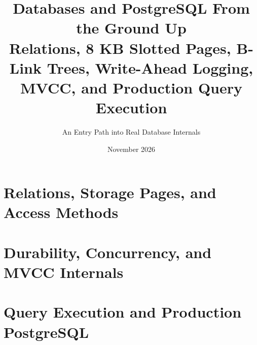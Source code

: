 \documentclass[11pt]{book}
\title{\textbf{Databases and PostgreSQL From the Ground Up}\\[0.4em]\large Relations, 8 KB Slotted Pages, B-Link Trees, Write-Ahead Logging, MVCC, and Production Query Execution}
\author{An Entry Path into Real Database Internals}
\date{November 2026}
\begin{document}
\frontmatter
\maketitle

\tableofcontents

\mainmatter

\part{Relations, Storage Pages, and Access Methods}




\part{Durability, Concurrency, and MVCC Internals}




\part{Query Execution and Production PostgreSQL}


\end{document}
